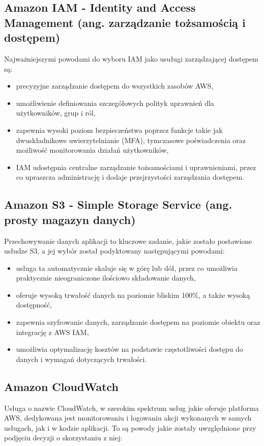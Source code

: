\documentclass[12pt,twoside]{book}
\begin{document}
    \subsection{Amazon IAM - Identity and Access Management (ang. zarządzanie tożsamością i dostępem)}
    Najważniejszymi powodami do wyboru IAM jako usuługi zarządzającej dostępem są:

    \begin{itemize}
        \item precyzyjne zarządzanie dostępem do wszystkich zasobów AWS,
        \item umożliwienie definiowania szczegółowych polityk uprawnień dla użytkowników, grup i ról,
        \item zapewnia wysoki poziom bezpieczeństwa poprzez funkcje takie jak dwuskładnikowe uwierzytelnianie (MFA), tymczasowe poświadczenia oraz możliwość monitorowania działań użytkowników,
        \item IAM udostępnia centralne zarządzanie tożsamościami i uprawnieniami, przez co upraszcza administrację i dodaje przejrzystości zarządzania dostępem. \cite{aws.iam}
    \end{itemize}

    \subsection{Amazon S3 - Simple Storage Service (ang. prosty magazyn danych)}
    Przechowywanie danych aplikacji to kluczowe zadanie, jakie zostało postawione usłudze S3, a jej wybór został podyktowany następującymi powodami:

    \begin{itemize}
        \item usługa ta automatycznie skaluje się w górę lub dół, przez co umożliwia praktycznie nieograniczone ilościowo składowanie danych,
        \item oferuje wysoką trwałość danych na poziomie bliskim 100\%, a także wysoką dostępność,
        \item zapewnia szyfrowanie danych, zarządzanie dostępem na poziomie obiektu oraz integrację z AWS IAM,
        \item umożliwia optymalizację kosztów na podstawie częstotliwości dostępu do danych i wymagań dotyczących trwałości. \cite{aws.s3}
    \end{itemize}

    \subsection{Amazon CloudWatch}
    Usługa o nazwie CloudWatch, w szerokim spektrum usług jakie oferuje platforma AWS, dedykowana jest monitorowaniu i logowaniu akcji wykonanych w samych usługach, jak i w kodzie aplikacji. To są powody jakie zostały uwzględnione przy podjęciu decyzji o skorzystaniu z niej:
\end{document}
